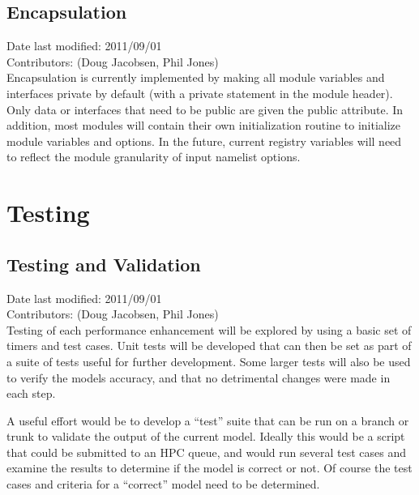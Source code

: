 \documentclass[11pt]{report}
\begin{document}
\FloatBarrier
\section{Encapsulation}
Date last modified: 2011/09/01 \\
Contributors: (Doug Jacobsen, Phil Jones) \\

Encapsulation is currently implemented by making all module variables and interfaces private by default (with a private statement in the module header).  Only data or interfaces that need to be public are given the public attribute.  In addition, most modules will contain their own initialization routine to initialize module variables and options.  In the future, current registry variables will need to reflect the module granularity of input namelist options.


\chapter{Testing}
\section{Testing and Validation}
Date last modified: 2011/09/01 \\
Contributors: (Doug Jacobsen, Phil Jones) \\

Testing of each performance enhancement will be explored by using a basic set of timers and test cases. Unit tests will be developed that can then be set as part of a suite of tests useful for further development. Some larger tests will also be used to verify the models accuracy, and that no detrimental changes were made in each step.

A useful effort would be to develop a ``test'' suite that can be run on a branch or trunk to validate the output of the current model. Ideally this would be a script that could be submitted to an HPC queue, and would run several test cases and examine the results to determine if the model is correct or not. Of course the test cases and criteria for a ``correct'' model need to be determined.

\end{document}

